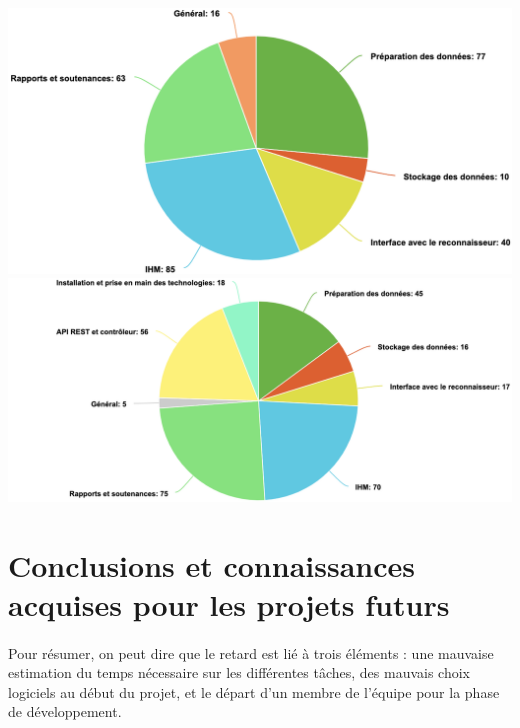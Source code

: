 \begin{mdframed}[frametitle={Figure 6 : Répartitions théorique et réelle des heures du projet}, innerbottommargin=10]
\begin{center}
\includegraphics[scale=0.6]{assets/repartition1.png}
\includegraphics[scale=0.6]{assets/repartition2.png}
\end{center}
\end{mdframed}

\section{Conclusions et connaissances acquises pour les projets futurs}

\paragraph{}
Pour résumer, on peut dire que le retard est lié à trois éléments : une mauvaise estimation du temps nécessaire sur les différentes tâches, des mauvais choix logiciels au début du projet, et le départ d'un membre de l'équipe pour la phase de développement.

